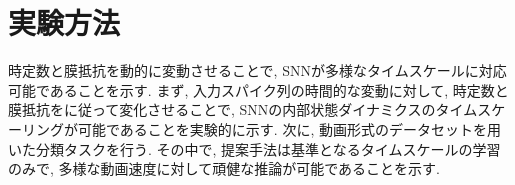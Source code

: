 \section{実験方法}
時定数と膜抵抗を動的に変動させることで, SNNが多様なタイムスケールに対応可能であることを示す.
まず, 入力スパイク列の時間的な変動に対して, 時定数と膜抵抗をに従って変化させることで, SNNの内部状態ダイナミクスのタイムスケーリングが可能であることを実験的に示す.
次に, 動画形式のデータセットを用いた分類タスクを行う.
その中で, 提案手法は基準となるタイムスケールの学習のみで, 多様な動画速度に対して頑健な推論が可能であることを示す.


